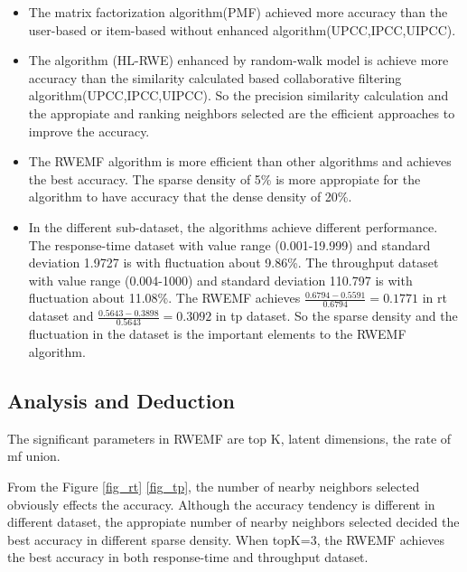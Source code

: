 \documentclass[conference]{IEEEtran}
\begin{document}
\begin{itemize}
\item The matrix factorization algorithm(PMF) achieved more accuracy than the user-based or item-based without enhanced algorithm(UPCC,IPCC,UIPCC). 
\item The algorithm (HL-RWE) enhanced by random-walk model is achieve more accuracy than the similarity calculated based collaborative filtering algorithm(UPCC,IPCC,UIPCC). So the precision similarity calculation and the appropiate and ranking neighbors selected are the efficient approaches to improve the accuracy.
\item The RWEMF algorithm is more efficient than other algorithms and achieves the best accuracy. The sparse density of 5\% is more appropiate for the algorithm to have accuracy that the dense density of 20\%.
\item In the different sub-dataset, the algorithms achieve different performance. The response-time dataset with value range (0.001-19.999) and standard deviation 1.9727 is with fluctuation about 9.86\%. The throughput dataset with value range (0.004-1000) and standard deviation 110.797 is with fluctuation about 11.08\%. The RWEMF achieves $\frac{0.6794-0.5591}{0.6794}=0.1771$ in rt dataset and $\frac{0.5643-0.3898}{0.5643}=0.3092$ in tp dataset. So the sparse density and the fluctuation in the dataset is the important elements to the RWEMF algorithm.
\end{itemize}

\subsection{Analysis and Deduction}
\par The significant parameters in RWEMF are top K, latent dimensions, the rate of mf union. 

\par From the Figure \ref{fig_rt} \ref{fig_tp}, the number of nearby neighbors selected obviously effects the accuracy. Although the accuracy tendency is different in different dataset, the appropiate number of nearby neighbors selected decided the best accuracy in different sparse density. When topK=3, the RWEMF achieves the best accuracy in both response-time and throughput dataset. 
\end{document}
